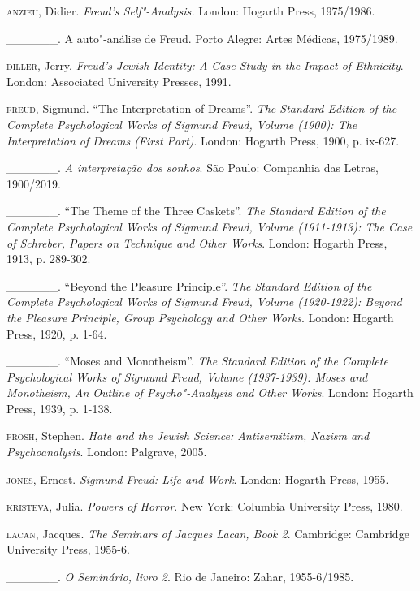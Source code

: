 \begin{Parskip}
\textsc{anzieu}, Didier. \emph{Freud's Self"-Analysis.} London: Hogarth Press, 1975/1986.

\_\_\_\_\_\_. A auto"-análise de Freud. Porto Alegre: Artes Médicas, 1975/1989.

\textsc{diller}, Jerry. \emph{Freud's Jewish Identity: A Case Study in the
Impact of Ethnicity}. London: Associated University Presses, 1991.

\textsc{freud}, Sigmund. ``The Interpretation of Dreams''. \emph{The Standard
Edition of the Complete Psychological Works of Sigmund Freud, Volume 
(1900): The Interpretation of Dreams (First Part)}. London: Hogarth Press, 1900, p. ix-627.

\_\_\_\_\_\_. \emph{A interpretação dos sonhos}. São Paulo: Companhia das Letras, 1900/2019.

\_\_\_\_\_\_. ``The Theme of the Three Caskets''. \emph{The Standard
Edition of the Complete Psychological Works of Sigmund Freud, Volume 
(1911-1913): The Case of Schreber, Papers on Technique and Other Works}.
London: Hogarth Press, 1913, p. 289-302.

\_\_\_\_\_\_. ``Beyond the Pleasure Principle''. \emph{The Standard
Edition of the Complete Psychological Works of Sigmund Freud, Volume
 (1920-1922): Beyond the Pleasure Principle, Group Psychology and
Other Works}. London: Hogarth Press, 1920, p. 1-64.

\_\_\_\_\_\_. ``Moses and Monotheism''. \emph{The Standard Edition of the
Complete Psychological Works of Sigmund Freud, Volume  (1937-1939):
Moses and Monotheism, An Outline of Psycho"-Analysis and Other Works}.
London: Hogarth Press, 1939, p. 1-138.

\textsc{frosh}, Stephen. \emph{Hate and the Jewish Science: Antisemitism, Nazism
and Psychoanalysis}. London: Palgrave, 2005.

\textsc{jones}, Ernest. \emph{Sigmund Freud: Life and Work}. London: Hogarth Press, 1955.

\textsc{kristeva}, Julia. \emph{Powers of Horror}. New York: Columbia
University Press, 1980.

\textsc{lacan}, Jacques. \emph{The Seminars of Jacques Lacan, Book 2}.
Cambridge: Cambridge University Press, 1955-6.

\_\_\_\_\_\_. \emph{O Seminário, livro 2}. Rio de Janeiro: Zahar, 1955-6/1985.
\end{Parskip}

